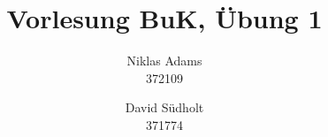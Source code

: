 \documentclass{exercisesheet}
\title{Vorlesung BuK, Übung 1}
\author{
    Niklas Adams  \\ 372109
    \and
    David S\"udholt   \\ 371774
}
\begin{document}
\maketitle
\pointtable





\end{document}
